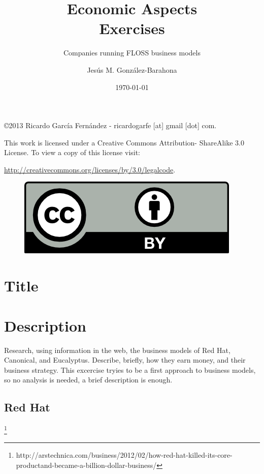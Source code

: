 \documentclass[11pt]{scrartcl}
\title{\textbf{Economic Aspects\\
                Exercises}}
\subtitle{Companies running FLOSS business models}
\author{Jesús M. González-Barahona}
\date{\today}
\begin{document}
\maketitle

\vfill

\begin{flushright}
    \copyright  2013 Ricardo Garc\'ia Fern\'andez - ricardogarfe [at] gmail [dot] com.

    This work is licensed under a Creative Commons Attribution- ShareAlike 3.0 License.
    To view a copy of this license visit:
 
    \url{http://creativecommons.org/licenses/by/3.0/legalcode}.
\end{flushright}

\begin{figure}[h]
    \begin{flushright}	
        \includegraphics{by}
        \label{fig:by-sa}
    \end{flushright}
\end{figure}

\newpage

\section{Title}

\section{Description}

Research, using information in the web, the business models of Red Hat, 
Canonical, and Eucalyptus. Describe, briefly, how they earn money, and their 
business strategy. This excercise tryies to be a first approach to business 
models, so no analysis is needed, a brief description is enough.

\subsection{Red Hat}

\footnote{http://arstechnica.com/business/2012/02/how-red-hat-killed-its-core-productand-became-a-billion-dollar-business/}\\
 
\end{document}
